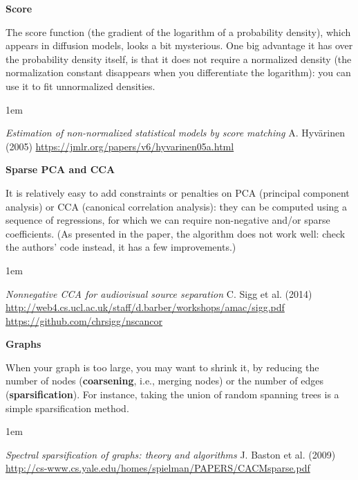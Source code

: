 \documentclass[a5paper]{article}
\let\d\textbf
\newenvironment{reference}{%
  \medskip\goodbreak
  \parskip 0pt
  \raggedright
  \leftskip 1em
  \obeylines
}{\par\medskip\goodbreak}
\def\subsection#1{{\par\bigskip\goodbreak\large\bfseries #1\par}}
\begin{document}
\subsection{Score}

The score function (the gradient of the logarithm of a probability density),
which appears in diffusion models,
looks a bit mysterious.
One big advantage it has over the probability density itself,
is that it does not require a normalized density
(the normalization constant disappears when you differentiate the logarithm):
you can use it to fit unnormalized densities.

\begin{reference}
  \emph{Estimation of non-normalized  statistical models by score matching}
  A. Hyvärinen (2005)
  \url{https://jmlr.org/papers/v6/hyvarinen05a.html}
\end{reference}

\subsection{Sparse PCA and CCA}

It is relatively easy to add constraints or penalties on
PCA (principal component analysis) or CCA (canonical correlation analysis):
they can be computed using a sequence of regressions,
for which we can require non-negative and/or sparse coefficients.
(As presented in the paper, the algorithm does not work well:
check the authors' code instead, it has a few improvements.)

\begin{reference}
  \emph{Nonnegative CCA  for audiovisual source separation}
  C. Sigg et al. (2014)
  \url{http://web4.cs.ucl.ac.uk/staff/d.barber/workshops/amac/sigg.pdf}
  \url{https://github.com/chrsigg/nscancor}
\end{reference}

\subsection{Graphs}

When your graph is too large, you may want to shrink it,
by reducing the number of nodes (\d{coarsening}, i.e., merging nodes)
or the number of edges (\d{sparsification}).
For instance, taking the union of random spanning trees
is a simple sparsification method.

\begin{reference}
  \emph{Spectral sparsification of graphs:  theory and algorithms}
  J. Baston et al. (2009)
  \url{http://cs-www.cs.yale.edu/homes/spielman/PAPERS/CACMsparse.pdf}
\end{reference}
\end{document}
